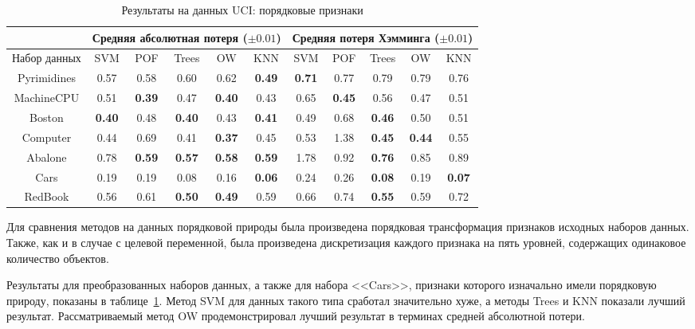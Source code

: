 \documentclass{elsarticle}
\begin{document}
\begin{table}
\begin{scriptsize}
\begin{center}
\caption{Результаты на данных UCI: порядковые признаки}
\label{tab:ResOrdFeat}
\begin{tabular}{|c|ccccc|ccccc|}
\hline
   &  \multicolumn{5}{c|}{Средняя абсолютная потеря ($\pm 0.01$)} & \multicolumn{5}{c|}{Средняя потеря Хэмминга ($\pm 0.01$)} \\
   \hline
Набор данных & SVM & POF & Trees & OW & KNN & SVM & POF & Trees & OW & KNN \\
   \hhline{|=|=====|=====|}
Pyrimidines &    0.57 & 0.58 & 0.60 & 0.62 & \textbf{0.49} & \textbf{0.71} & 0.77 & 0.79 & 0.79 & 0.76 \\
\hline
MachineCPU &    0.51 & \textbf{0.39} & 0.47 & \textbf{0.40} & 0.43 & 0.65 & \textbf{0.45} & 0.56 & 0.47 & 0.51 \\
\hline
Boston &     \textbf{0.40} & 0.48 & \textbf{0.40} & 0.43 & \textbf{0.41} & 0.49 & 0.68 & \textbf{0.46} & 0.50 & 0.51 \\
\hline
Computer &     0.44 & 0.69 & 0.41 & \textbf{0.37} & 0.45 & 0.53 & 1.38 & \textbf{0.45} & \textbf{0.44} & 0.55 \\
\hline
Abalone &    0.78 & \textbf{0.59} & \textbf{0.57} & \textbf{0.58} & \textbf{0.59} & 1.78 & 0.92 & \textbf{0.76} & 0.85 & 0.89 \\
\hhline{|=|=====|=====|}
Cars &    0.19 & 0.19 & 0.08 & 0.16 & \textbf{0.06} & 0.24 & 0.26 & \textbf{0.08} & 0.19 & \textbf{0.07} \\
\hline
RedBook &    0.56 & 0.61 & \textbf{0.50} & \textbf{0.49} & 0.59 & 0.66 & 0.74 & \textbf{0.55} & 0.59 & 0.72 \\
\hline
\end{tabular}
\end{center}
\end{scriptsize}
\end{table}

Для сравнения методов на данных порядковой природы была произведена порядковая трансформация признаков исходных наборов данных. Также, как и в случае с целевой переменной, была произведена дискретизация каждого признака на пять уровней, содержащих одинаковое количество объектов.

Результаты для преобразованных наборов данных, а также для набора <<Cars>>, признаки которого изначально имели порядковую природу, показаны в таблице~\ref{tab:ResOrdFeat}. Метод SVM для данных такого типа сработал значительно хуже, а методы Trees и KNN показали лучший результат. Рассматриваемый метод OW продемонстрировал лучший результат в терминах средней абсолютной потери.
\end{document}
